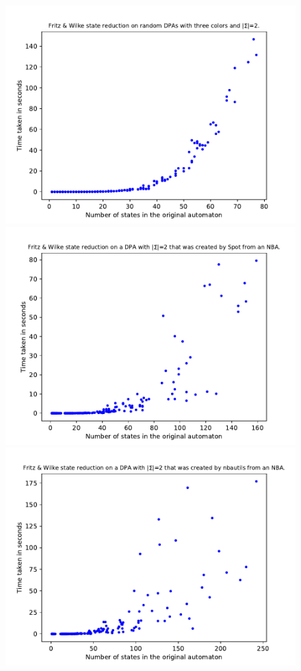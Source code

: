 \begin{figure}
	\centering
	\begin{minipage}{0.49\textwidth}
		\includegraphics[page=4,height=.3\textheight]{../data/analysis/fritzwilke/gendet_ap1.pdf} 
		\includegraphics[page=4,height=.3\textheight]{../data/analysis/fritzwilke/detspot_ap1.pdf} 
		\includegraphics[page=4,height=.3\textheight]{../data/analysis/fritzwilke/detnbaut_ap1.pdf} 

\end{minipage}
\end{figure}
